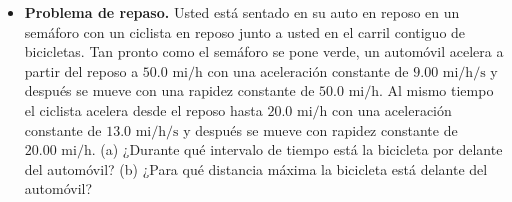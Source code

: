 \documentclass[11pt,a4paper]{article}
\begin{document}
\begin{itemize}
    \item[\textbf{44.}] \textbf{Problema de repaso.} Usted está sentado en su auto en reposo en un semáforo con un ciclista en reposo junto a usted en el carril contiguo de bicicletas. Tan pronto como el semáforo se pone verde, un automóvil acelera a partir del reposo a $50.0 \text{ mi/h}$ con una aceleración constante de $9.00 \text{ mi/h/s}$ y después se mueve con una rapidez constante de $50.0 \text{ mi/h}$. Al mismo tiempo el ciclista acelera desde el reposo hasta $20.0 \text{ mi/h}$ con una aceleración constante de $13.0 \text{ mi/h/s}$ y después se mueve con rapidez constante de $20.00 \text{ mi/h}$. (a) ¿Durante qué intervalo de tiempo está la bicicleta por delante del automóvil? (b) ¿Para qué distancia máxima la bicicleta está delante del automóvil?
    \vspace*{8cm}
\end{itemize}
\end{document}
